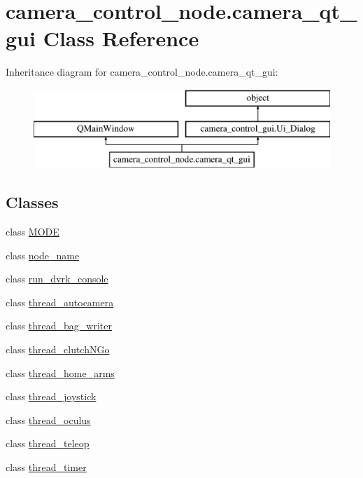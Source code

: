 \hypertarget{classcamera__control__node_1_1camera__qt__gui}{\section{camera\-\_\-control\-\_\-node.\-camera\-\_\-qt\-\_\-gui Class Reference}
\label{classcamera__control__node_1_1camera__qt__gui}
}
Inheritance diagram for camera\-\_\-control\-\_\-node.\-camera\-\_\-qt\-\_\-gui\-:\begin{figure}[H]
\begin{center}
\leavevmode
\includegraphics[height=3.000000cm]{classcamera__control__node_1_1camera__qt__gui}
\end{center}
\end{figure}
\subsection*{Classes}
\begin{DoxyCompactItemize}
\item 
class \hyperlink{classcamera__control__node_1_1camera__qt__gui_1_1MODE}{M\-O\-D\-E}
\item 
class \hyperlink{classcamera__control__node_1_1camera__qt__gui_1_1node__name}{node\-\_\-name}
\item 
class \hyperlink{classcamera__control__node_1_1camera__qt__gui_1_1run__dvrk__console}{run\-\_\-dvrk\-\_\-console}
\item 
class \hyperlink{classcamera__control__node_1_1camera__qt__gui_1_1thread__autocamera}{thread\-\_\-autocamera}
\item 
class \hyperlink{classcamera__control__node_1_1camera__qt__gui_1_1thread__bag__writer}{thread\-\_\-bag\-\_\-writer}
\item 
class \hyperlink{classcamera__control__node_1_1camera__qt__gui_1_1thread__clutchNGo}{thread\-\_\-clutch\-N\-Go}
\item 
class \hyperlink{classcamera__control__node_1_1camera__qt__gui_1_1thread__home__arms}{thread\-\_\-home\-\_\-arms}
\item 
class \hyperlink{classcamera__control__node_1_1camera__qt__gui_1_1thread__joystick}{thread\-\_\-joystick}
\item 
class \hyperlink{classcamera__control__node_1_1camera__qt__gui_1_1thread__oculus}{thread\-\_\-oculus}
\item 
class \hyperlink{classcamera__control__node_1_1camera__qt__gui_1_1thread__teleop}{thread\-\_\-teleop}
\item 
class \hyperlink{classcamera__control__node_1_1camera__qt__gui_1_1thread__timer}{thread\-\_\-timer}
\end{DoxyCompactItemize}

